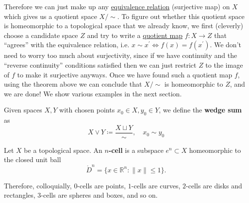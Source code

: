   Therefore we can just make up any \hyperref[st-def:equivalence_relation]{equivalence relation} (surjective map) on $X$ which gives us a quotient space $X/{\sim}$. To figure out whether this quotient space is homeomorphic to a topological space that we already know, we first (cleverly) choose a candidate space $Z$ and try to write a \hyperref[def:quotient-map]{quotient map} $f: X \rightarrow Z$ that ``agrees'' with the equivalence relation, i.e. $x \sim x^\prime \iff f(x) = f(x^\prime)$. We don't need to worry too much about surjectivity, since if we have continuity and the ``reverse continuity'' conditions satisfied then we can just restrict $Z$ to the image of $f$ to make it surjective anyways. Once we have found such a quotient map $f$, using the theorem above we can conclude that $X/{\sim}$ is homeomorphic to $Z$, and we are done! We show various examples in the next section. 

	\begin{definition}
	  \label{def:wedge-sum}
		Given spaces $X, Y$ with chosen points $x_0 \in X, y_0 \in Y$, we define the \textbf{wedge sum} as
		\begin{equation}
			X \vee Y \coloneqq \frac{X \sqcup Y}{\sim}, \quad x_0 \sim y_0
		\end{equation}
	\end{definition}

	\begin{definition}[Cell]
	  \label{def:cell}
		Let $X$ be a topological space. An \textbf{$n$-cell} is a subspace $e^n \subset X$ homeomorphic to the closed unit ball
		\begin{equation}
			\mathring{D}^n = \{x \in \mathbb{R}^n : \|x\| \leq 1\}.
		\end{equation}
	\end{definition}

	Therefore, colloquially, $0$-cells are points, $1$-cells are curves, $2$-cells are disks and rectangles, $3$-cells are spheres and boxes, and so on. 

